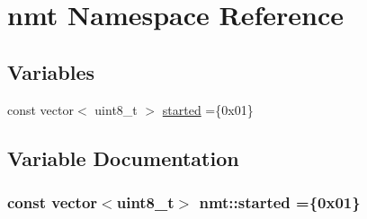 \hypertarget{namespacenmt}{}\section{nmt Namespace Reference}
\label{namespacenmt}
\subsection*{Variables}
\begin{DoxyCompactItemize}
\item 
const vector$<$ uint8\+\_\+t $>$ \hyperlink{namespacenmt_a1310e5c59553352490180a42ef1dad8c}{started} =\{0x01\}
\end{DoxyCompactItemize}


\subsection{Variable Documentation}
\subsubsection[{\texorpdfstring{started}{started}}]{\setlength{\rightskip}{0pt plus 5cm}const vector$<$uint8\+\_\+t$>$ nmt\+::started =\{0x01\}}\hypertarget{namespacenmt_a1310e5c59553352490180a42ef1dad8c}{}\label{namespacenmt_a1310e5c59553352490180a42ef1dad8c}
